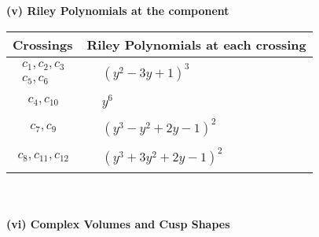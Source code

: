 \documentclass[1p]{elsarticle_modified}
\theoremstyle{definition}
\begin{document}
\newpage\renewcommand{\arraystretch}{1}
\flushleft \textbf{(v) Riley Polynomials at the component}\newline \\
\begin{tabular}{m{50pt}|m{274pt}}
Crossings & \hspace{64pt}Riley Polynomials at each crossing \\
\hline $$\begin{aligned}c_{1},c_{2},c_{3}\\c_{5},c_{6}\end{aligned}$$&$\begin{aligned}
&(y^2-3 y+1)^3
\end{aligned}$\\
\hline $$\begin{aligned}c_{4},c_{10}\end{aligned}$$&$\begin{aligned}
&y^6
\end{aligned}$\\
\hline $$\begin{aligned}c_{7},c_{9}\end{aligned}$$&$\begin{aligned}
&(y^3- y^2+2 y-1)^2
\end{aligned}$\\
\hline $$\begin{aligned}c_{8},c_{11},c_{12}\end{aligned}$$&$\begin{aligned}
&(y^3+3 y^2+2 y-1)^2
\end{aligned}$\\
\hline
\end{tabular}\\~\\
\newpage\flushleft \textbf{(vi) Complex Volumes and Cusp Shapes}
\end{document}
